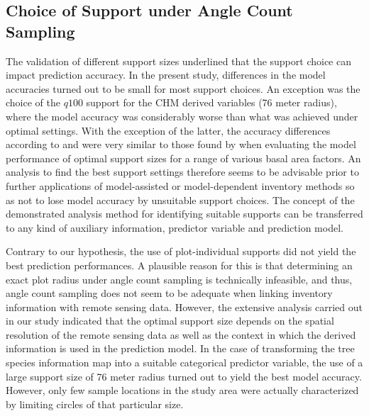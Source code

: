 \subsection{Choice of Support under Angle Count Sampling}
\label{sec:supp_choice_dis}

The validation of different support sizes underlined that the support choice can impact prediction accuracy. In the present study, differences in the model accuracies turned out to be small for most support choices. An exception was the choice of the $q100$ support for the CHM derived variables (76 meter radius), where the model accuracy was considerably worse than what was achieved under optimal settings. With the exception of the latter, the accuracy differences according to \adjrsq{} and \rmsecv{} were very similar to those found by \citet{deo2016} when evaluating the model performance of optimal support sizes for a range of various basal area factors. An analysis to find the best support settings therefore seems to be advisable prior to further applications of model-assisted or model-dependent inventory methods so as not to lose model accuracy by unsuitable support choices. The concept of the demonstrated analysis method for identifying suitable supports can be transferred to any kind of auxiliary information, predictor variable and prediction model.\par
Contrary to our hypothesis, the use of plot-individual supports did not yield the best prediction performances. A plausible reason for this is that determining an exact plot radius under angle count sampling is technically infeasible, and thus, angle count sampling does not seem to be adequate when linking inventory information with remote sensing data. However, the extensive analysis carried out in our study indicated that the optimal support size depends on the spatial resolution of the remote sensing data as well as the context in which the derived information is used in the prediction model. In the case of transforming the tree species information map into a suitable categorical predictor variable, the use of a large support size of 76 meter radius turned out to yield the best model accuracy. However, only few sample locations in the study area were actually characterized by limiting circles of that particular size.

%
%
%
%
%
%
%














